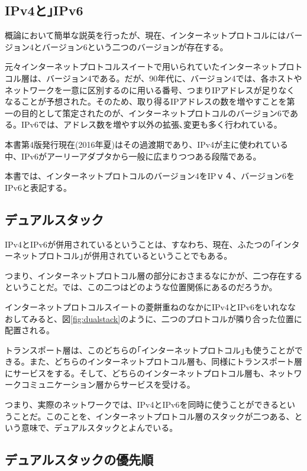 \subsection{IPv4と｣IPv6}
概論において簡単な説英を行ったが、現在、インターネットプロトコルにはバージョン4とバージョン6という二つのバージョンが存在する。

元々インターネットプロトコルスイートで用いられていたインターネットプロトコル層は、バージョン4である。だが、90年代に、バージョン4では、各ホストやネットワークを一意に区別するのに用いる番号、つまりIPアドレスが足りなくなることが予想された。そのため、取り得るIPアドレスの数を増やすことを第一の目的として策定されたのが、インターネットプロトコルのバージョン6である。IPv6では、アドレス数を増やす以外の拡張､変更も多く行われている。

本書第4版発行現在(2016年夏)はその過渡期であり、IPv4が主に使われている中、IPv6がアーリーアダプタから一般に広まりつつある段階である。

本書では、インターネットプロトコルのバージョン4をIPｖ４、バージョン6をIPv6と表記する。

\subsection{デュアルスタック}

IPv4とIPv6が併用されているということは、すなわち、現在、ふたつの｢インターネットプロトコル｣が併用されているということでもある。

つまり、インターネットプロトコル層の部分におさまるなにかが、二つ存在するということだ。では、この二つはどのような位置関係にあるのだろうか。

インターネットプロトコルスイートの菱餅重ねのなかにIPv4とIPv6をいれななおしてみると、図\ref{fig:dualstack}のように、二つのプロトコルが隣り合った位置に配置される。

トランスポート層は、このどちらの｢インターネットプロトコル｣も使うことができる。また、どちらのインターネットプロトコル層も、同様にトランスポート層にサービスをする。そして、どちらのインターネットプロトコル層も、ネットワークコミュニケーション層からサービスを受ける。

つまり、実際のネットワークでは、IPv4とIPv6を同時に使うことができるということだ。このことを、インターネットプロトコル層のスタックが二つある、という意味で、デュアルスタックとよんでいる。

\subsection{デュアルスタックの優先順}

